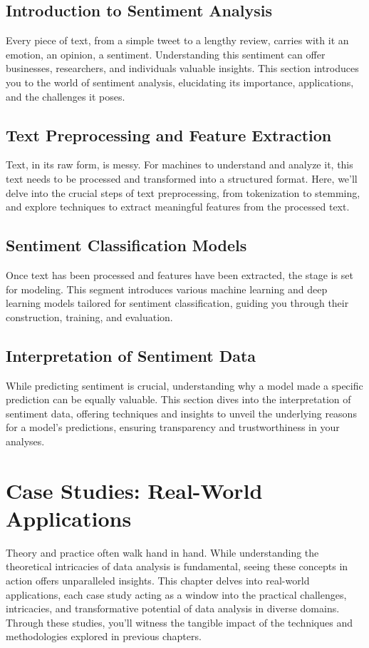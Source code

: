 \documentclass[a4paper,12pt]{book}
\begin{document}
\section{Introduction to Sentiment Analysis}
Every piece of text, from a simple tweet to a lengthy review, carries with it an emotion, an opinion, a sentiment. Understanding this sentiment can offer businesses, researchers, and individuals valuable insights. This section introduces you to the world of sentiment analysis, elucidating its importance, applications, and the challenges it poses.

\section{Text Preprocessing and Feature Extraction}
Text, in its raw form, is messy. For machines to understand and analyze it, this text needs to be processed and transformed into a structured format. Here, we'll delve into the crucial steps of text preprocessing, from tokenization to stemming, and explore techniques to extract meaningful features from the processed text.

\section{Sentiment Classification Models}
Once text has been processed and features have been extracted, the stage is set for modeling. This segment introduces various machine learning and deep learning models tailored for sentiment classification, guiding you through their construction, training, and evaluation.

\section{Interpretation of Sentiment Data}
While predicting sentiment is crucial, understanding why a model made a specific prediction can be equally valuable. This section dives into the interpretation of sentiment data, offering techniques and insights to unveil the underlying reasons for a model's predictions, ensuring transparency and trustworthiness in your analyses.

\chapter{Case Studies: Real-World Applications}
Theory and practice often walk hand in hand. While understanding the theoretical intricacies of data analysis is fundamental, seeing these concepts in action offers unparalleled insights. This chapter delves into real-world applications, each case study acting as a window into the practical challenges, intricacies, and transformative potential of data analysis in diverse domains. Through these studies, you'll witness the tangible impact of the techniques and methodologies explored in previous chapters.
\end{document}
